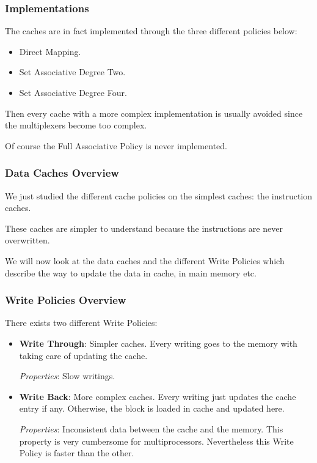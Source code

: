 
\begin{frame}
  \frametitle{Implementations}

  The caches are in fact implemented through the three different policies
  below:

  \begin{itemize}
    \item
      Direct Mapping.
    \item
      Set Associative Degree Two.
    \item
      Set Associative Degree Four.
  \end{itemize}

  Then every cache with a more complex implementation is usually avoided
  since the multiplexers become too complex.

  \-

  Of course the Full Associative Policy is never implemented.
\end{frame}


\begin{frame}
  \frametitle{Data Caches Overview}

  We just studied the different cache policies on the simplest caches:
  the instruction caches.

  \-

  These caches are simpler to understand because the instructions are
  never overwritten.

  \-

  We will now look at the data caches and the different Write Policies
  which describe the way to update the data in cache, in main memory etc.
\end{frame}


\begin{frame}
  \frametitle{Write Policies Overview}

  There exists two different Write Policies:

  \begin{itemize}
    \item
      \textbf{Write Through}: Simpler caches. Every writing goes to the
      memory with taking care of updating the cache.

      \textit{Properties}: Slow writings.
    \item
      \textbf{Write Back}: More complex caches. Every writing just updates
      the cache entry if any. Otherwise, the block is loaded in cache
      and updated here.

      \textit{Properties}: Inconsistent data between the cache and the memory.
      This property is very cumbersome for multiprocessors. Nevertheless this
      Write Policy is faster than the other.
  \end{itemize}
\end{frame}

